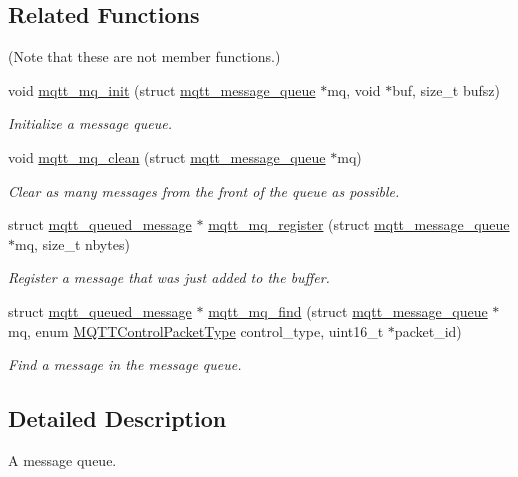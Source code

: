 \subsection*{Related Functions}
(Note that these are not member functions.) \begin{DoxyCompactItemize}
\item 
void \hyperlink{group__details_ga0da861c969387bf8d0229924543d9bb7}{mqtt\+\_\+mq\+\_\+init} (struct \hyperlink{structmqtt__message__queue}{mqtt\+\_\+message\+\_\+queue} $\ast$mq, void $\ast$buf, size\+\_\+t bufsz)
\begin{DoxyCompactList}\small\item\em Initialize a message queue. \end{DoxyCompactList}\item 
void \hyperlink{group__details_gadb54c413b4d884619c50cc20ee6eb084}{mqtt\+\_\+mq\+\_\+clean} (struct \hyperlink{structmqtt__message__queue}{mqtt\+\_\+message\+\_\+queue} $\ast$mq)
\begin{DoxyCompactList}\small\item\em Clear as many messages from the front of the queue as possible. \end{DoxyCompactList}\item 
struct \hyperlink{structmqtt__queued__message}{mqtt\+\_\+queued\+\_\+message} $\ast$ \hyperlink{group__details_gaa34e6af3ab1af60ebf8fe7b86be868fc}{mqtt\+\_\+mq\+\_\+register} (struct \hyperlink{structmqtt__message__queue}{mqtt\+\_\+message\+\_\+queue} $\ast$mq, size\+\_\+t nbytes)
\begin{DoxyCompactList}\small\item\em Register a message that was just added to the buffer. \end{DoxyCompactList}\item 
struct \hyperlink{structmqtt__queued__message}{mqtt\+\_\+queued\+\_\+message} $\ast$ \hyperlink{group__details_ga1ffcd45af057865a0d85b4e9e24789a2}{mqtt\+\_\+mq\+\_\+find} (struct \hyperlink{structmqtt__message__queue}{mqtt\+\_\+message\+\_\+queue} $\ast$mq, enum \hyperlink{group__unpackers_gacbd36b88ec7f62bc161b07e1a0aed679}{M\+Q\+T\+T\+Control\+Packet\+Type} control\+\_\+type, uint16\+\_\+t $\ast$packet\+\_\+id)
\begin{DoxyCompactList}\small\item\em Find a message in the message queue. \end{DoxyCompactList}\end{DoxyCompactItemize}


\subsection{Detailed Description}
A message queue. 

